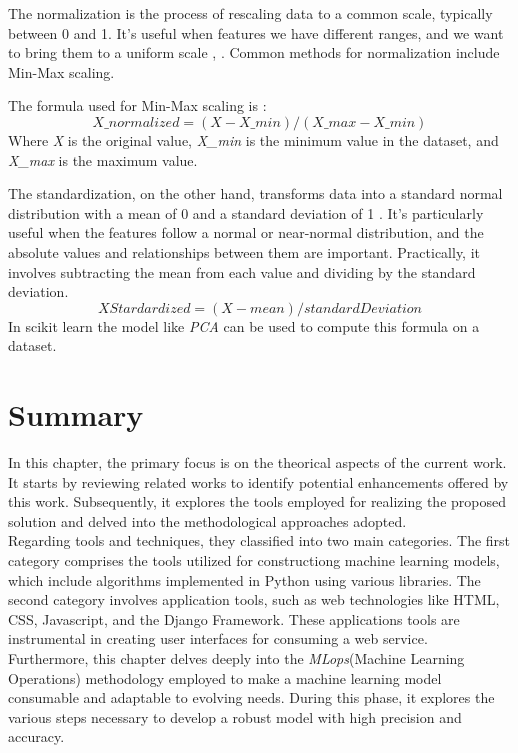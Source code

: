 \documentclass[12pt,a4paper, oneside]{book}
\begin{document}
The normalization is the process of rescaling data to a common scale, typically between 0 and 1. It's useful when features we have different ranges, and we want to bring them to a uniform scale \cite{ali2014data}, \cite{elen2021standardized}. Common methods for normalization include Min-Max scaling. 

The formula used for Min-Max scaling is : 
\begin{equation}
	X\_normalized = (X-X\_min)/(X\_max - X\_min)
\end{equation} 
Where \textit{X} is the original value, \textit{X\_min} is the minimum value in the dataset, and \textit{X\_max} is the maximum value.

The standardization, on the other hand, transforms data into a standard normal distribution with a mean of 0 and a standard deviation of 1 \cite{ali2014data}. It's particularly useful when the features follow a normal or near-normal distribution, and the absolute values and relationships between them are important. Practically, it involves subtracting the mean from each value and dividing by the standard deviation. 
\begin{equation}
	XStardardized = (X - mean) / standardDeviation
\end{equation}
In scikit learn the model like \textit{PCA} can be used to compute this formula on a dataset.
\section{Summary}
In this chapter, the primary focus is on the theorical aspects of the current work. It starts by reviewing related works to identify potential enhancements offered by this work. Subsequently, it explores the tools employed for realizing the proposed solution and delved into the methodological approaches adopted.\\

Regarding tools and techniques, they classified into two main categories. The first category comprises the tools utilized for constructiong machine learning models, which include algorithms implemented in Python using various libraries.
The second category involves application tools, such as web technologies like HTML, CSS, Javascript, and the Django Framework. These applications tools are instrumental in creating user interfaces for consuming a web service.\\

Furthermore, this chapter delves deeply into the \textit{MLops}(Machine Learning Operations) methodology employed to make a machine learning model consumable and adaptable to evolving needs. During this phase, it explores the various steps necessary to develop a robust model with high precision and accuracy.
\end{document}
